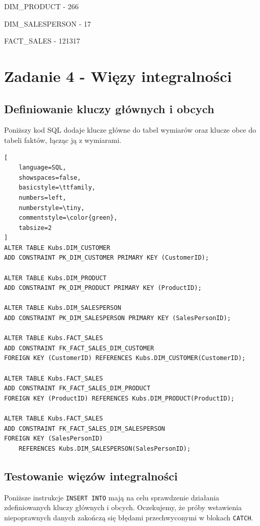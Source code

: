 \documentclass[a4paper,12pt]{article}
\begin{document}
DIM\_PRODUCT - 266

DIM\_SALESPERSON - 17

FACT\_SALES - 121317

\section{Zadanie 4 - Więzy integralności}

\subsection{Definiowanie kluczy głównych i obcych}

Poniższy kod SQL dodaje klucze główne do tabel wymiarów oraz klucze obce do tabeli faktów, łącząc ją z wymiarami.

    {\small
        \begin{lstlisting}[
    language=SQL,
    showspaces=false,
    basicstyle=\ttfamily,
    numbers=left,
    numberstyle=\tiny,
    commentstyle=\color{green},
    tabsize=2
]
ALTER TABLE Kubs.DIM_CUSTOMER
ADD CONSTRAINT PK_DIM_CUSTOMER PRIMARY KEY (CustomerID);

ALTER TABLE Kubs.DIM_PRODUCT
ADD CONSTRAINT PK_DIM_PRODUCT PRIMARY KEY (ProductID);

ALTER TABLE Kubs.DIM_SALESPERSON
ADD CONSTRAINT PK_DIM_SALESPERSON PRIMARY KEY (SalesPersonID);

ALTER TABLE Kubs.FACT_SALES
ADD CONSTRAINT FK_FACT_SALES_DIM_CUSTOMER
FOREIGN KEY (CustomerID) REFERENCES Kubs.DIM_CUSTOMER(CustomerID);

ALTER TABLE Kubs.FACT_SALES
ADD CONSTRAINT FK_FACT_SALES_DIM_PRODUCT
FOREIGN KEY (ProductID) REFERENCES Kubs.DIM_PRODUCT(ProductID);

ALTER TABLE Kubs.FACT_SALES
ADD CONSTRAINT FK_FACT_SALES_DIM_SALESPERSON
FOREIGN KEY (SalesPersonID) 
    REFERENCES Kubs.DIM_SALESPERSON(SalesPersonID);
\end{lstlisting}
    }

\subsection{Testowanie więzów integralności}

Poniższe instrukcje \texttt{INSERT INTO} mają na celu sprawdzenie działania zdefiniowanych kluczy głównych i obcych. Oczekujemy, że próby wstawienia niepoprawnych danych zakończą się błędami przechwyconymi w blokach \texttt{CATCH}.
\end{document}
